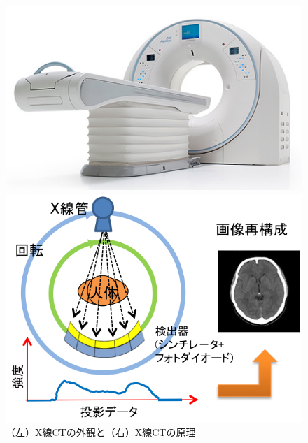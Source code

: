 \begin{figure}[H]
 \begin{minipage}{0.5\hsize}
  \begin{center}
  \includegraphics[bb=0.000000 0.000000 470.000000 293.000000,width=0.9\hsize]{image2/chapter1/toshibaCT.jpg} 
  \end{center}
  \vspace{-1cm}
  \caption*{}
 \end{minipage}
 \begin{minipage}{0.5\hsize}
  \begin{center}
 \includegraphics[bb=0.000000 0.000000 287.496234 222.221630,width=0.9\hsize]{image2/chapter1/CT_genri.png} 
  \end{center}
  \vspace{-1cm}
  \caption*{}
 \end{minipage}
 \begin{center}
  \caption{（左）X線CTの外観と（右）X線CTの原理\cite{toshiba_CT}}
  \label{fig:gaikan}
  \end{center}
\end{figure}


